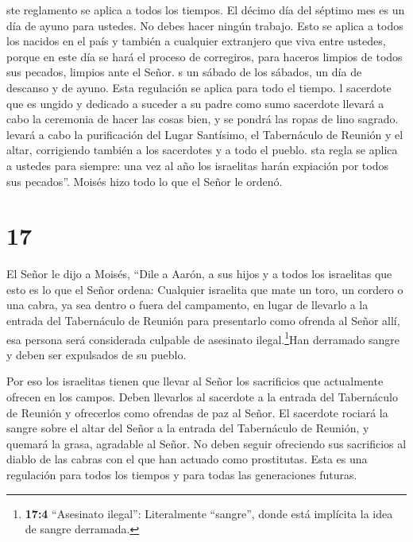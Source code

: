  ste reglamento se aplica a todos los tiempos. El décimo
día del séptimo mes es un día de ayuno para ustedes. No debes hacer
ningún trabajo. Esto se aplica a todos los nacidos en el país y también
a cualquier extranjero que viva entre ustedes,  porque en
este día se hará el proceso de corregiros, para haceros limpios de todos
sus pecados, limpios ante el Señor.  s un sábado de los
sábados, un día de descanso y de ayuno. Esta regulación se aplica para
todo el tiempo.  l sacerdote que es ungido y dedicado a
suceder a su padre como sumo sacerdote llevará a cabo la ceremonia de
hacer las cosas bien, y se pondrá las ropas de lino sagrado.
 levará a cabo la purificación del Lugar Santísimo, el
Tabernáculo de Reunión y el altar, corrigiendo también a los sacerdotes
y a todo el pueblo.  sta regla se aplica a ustedes para
siempre: una vez al año los israelitas harán expiación por todos sus
pecados''. Moisés hizo todo lo que el Señor le ordenó.

\hypertarget{section-16}{%
\section{17}\label{section-16}}

 El Señor le dijo a Moisés,  ``Dile a Aarón, a
sus hijos y a todos los israelitas que esto es lo que el Señor ordena:
 Cualquier israelita que mate un toro, un cordero o una
cabra, ya sea dentro o fuera del campamento,  en lugar de
llevarlo a la entrada del Tabernáculo de Reunión para presentarlo como
ofrenda al Señor allí, esa persona será considerada culpable de
asesinato ilegal.\footnote{\textbf{17:4} ``Asesinato ilegal'':
  Literalmente ``sangre'', donde está implícita la idea de sangre
  derramada.}Han derramado sangre y deben ser expulsados de su pueblo.

 Por eso los israelitas tienen que llevar al Señor los
sacrificios que actualmente ofrecen en los campos. Deben llevarlos al
sacerdote a la entrada del Tabernáculo de Reunión y ofrecerlos como
ofrendas de paz al Señor.  El sacerdote rociará la sangre
sobre el altar del Señor a la entrada del Tabernáculo de Reunión, y
quemará la grasa, agradable al Señor.  No deben seguir
ofreciendo sus sacrificios al diablo de las cabras con el que han
actuado como prostitutas. Esta es una regulación para todos los tiempos
y para todas las generaciones futuras.

